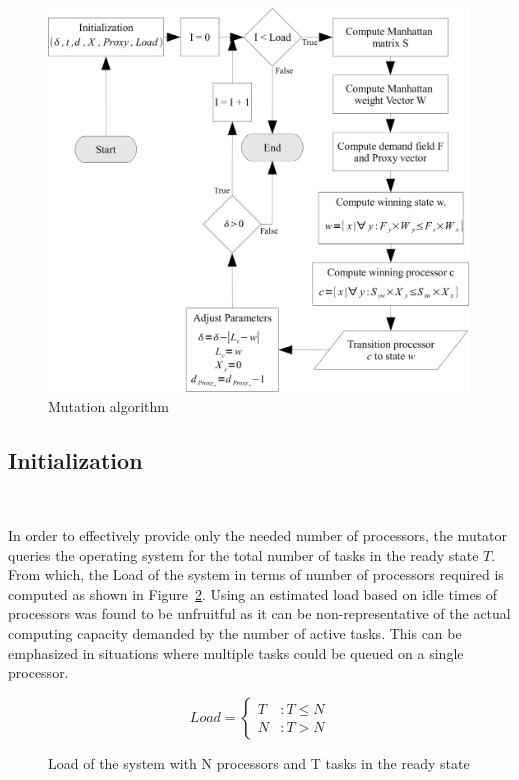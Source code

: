 \begin{figure}[h!]
  \begin{center}
    \includegraphics[height=4in]{Figures/Mutation_algo.jpg}%
    \caption{Mutation algorithm}
    \label{fig:mutation_algo}
  \end{center}
\end{figure}

\subsection{Initialization}~\label{sec:mut_init}

In order to effectively provide only the needed number of processors, the mutator
queries the operating system for the total number of tasks in the ready state $T$. 
From which, the Load of the system in terms of number of processors required is computed 
as shown in Figure~\ref{fig:projected_load}. Using an estimated load based on idle times
of processors was found to be unfruitful as it can be non-representative of the actual 
computing capacity demanded by the number of active tasks. This can be emphasized in situations where multiple
tasks could be queued on a single processor.

\begin{figure}[h!]
\centering
\begin{equation*}
    Load = \left\{
     \begin{array}{lr}
       T & : T \leq N\\
       N & : T > N
     \end{array}
   \right.
\end{equation*}
\caption{Load of the system with N processors and T tasks in the ready state}
\label{fig:projected_load}
\end{figure}

